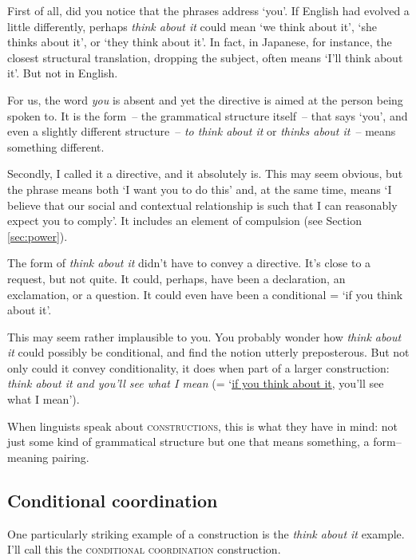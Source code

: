 First of all, did you notice that the phrases address `you'. If English had evolved a little differently, perhaps \textit{think about it} could mean `we think about it', `she thinks about it', or `they think about it'. In fact, in Japanese, for instance, the closest structural translation, dropping the subject, often means `I'll think about it'. But not in English.

For us, the word \textit{you} is absent and yet the directive is aimed at the person being spoken to. It is the form~-- the grammatical structure itself~-- that says `you', and even a slightly different structure~-- \textit{to think about it} or \textit{thinks about it}~-- means something different.

Secondly, I called it a directive, and it absolutely is. This may seem obvious, but the phrase means both `I want you to do this' and, at the same time, means `I believe that our social and contextual relationship is such that I can reasonably expect you to comply'. It includes an element of compulsion (see Section \ref{sec:power}).

The form of \textit{think about it} didn't have to convey a directive. It's close to a request, but not quite. It could, perhaps, have been a declaration, an exclamation, or a question. It could even have been a conditional = `if you think about it'.

This may seem rather implausible to you. You probably wonder how \textit{think about it} could possibly be conditional, and find the notion utterly preposterous. But not only could it convey conditionality, it does when part of a larger construction: \textit{think about it and you'll see what I mean} (= `\uline{if you think about it}, you'll see what I mean').

When linguists speak about \textsc{constructions}, this is what they have in mind: not just some kind of grammatical structure but one that means something, a form--meaning pairing.

\subsection{Conditional coordination}\label{sec:conditional-coordination}

One particularly striking example of a construction is the \textit{think about it} example. I'll call this the \textsc{conditional coordination} construction.

\ea\label{ex:conditional-coord}
   \z
\z

